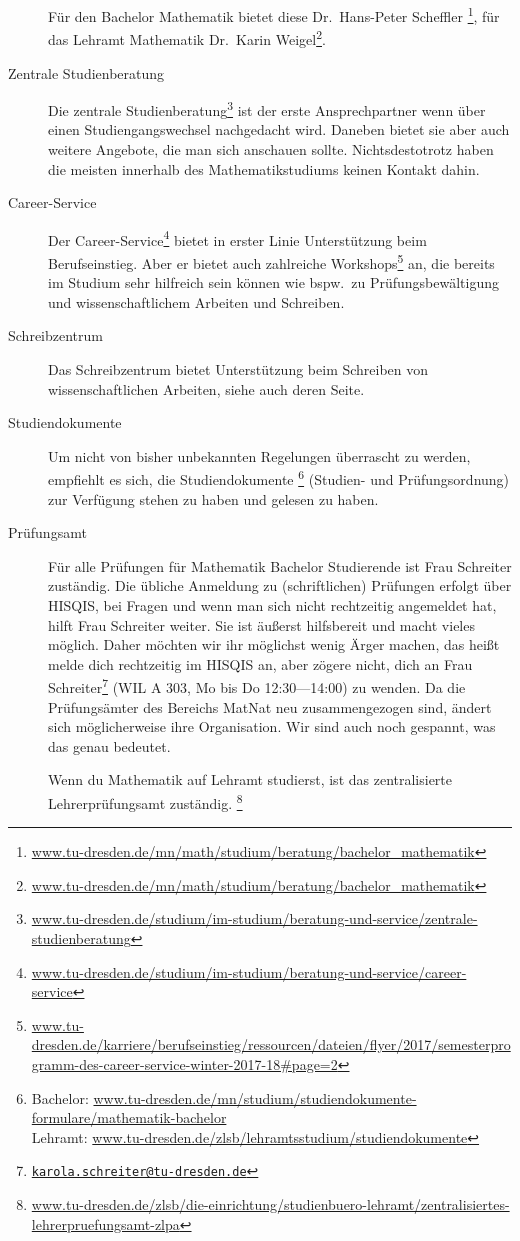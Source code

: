 \documentclass{scrartcl}
\begin{document}
\begin{description}
    Für den Bachelor Mathematik bietet diese Dr.\ Hans-Peter Scheffler%
    \footnote{\url{www.tu-dresden.de/mn/math/studium/beratung/bachelor_mathematik}}, für das Lehramt Mathematik Dr.\ Karin Weigel\footnote{\url{www.tu-dresden.de/mn/math/studium/beratung/bachelor_mathematik}}.
  \item[Zentrale Studienberatung] Die zentrale Studienberatung\footnote{\url{www.tu-dresden.de/studium/im-studium/beratung-und-service/zentrale-studienberatung}} ist der erste Ansprechpartner wenn über einen Studiengangswechsel nachgedacht wird. Daneben bietet sie aber auch weitere Angebote,
    die man sich anschauen sollte.
    Nichtsdestotrotz haben die meisten innerhalb des Mathematikstudiums keinen Kontakt dahin.
  \item[Career-Service] Der Career-Service\footnote{\url{www.tu-dresden.de/studium/im-studium/beratung-und-service/career-service}} bietet in erster Linie Unterstützung beim Berufseinstieg.
    Aber er bietet auch zahlreiche Workshops\footnote{\url{www.tu-dresden.de/karriere/berufseinstieg/ressourcen/dateien/flyer/2017/semesterprogramm-des-career-service-winter-2017-18\#page=2}} an, die bereits im Studium
    sehr hilfreich sein können wie bspw.\ zu Prüfungsbewältigung und
    wissenschaftlichem Arbeiten und Schreiben.
  \item[Schreibzentrum] Das Schreibzentrum bietet Unterstützung beim Schreiben von wissenschaftlichen Arbeiten, siehe auch deren Seite.
  \item[Studiendokumente] Um nicht von bisher unbekannten Regelungen
    überrascht zu werden, empfiehlt es sich, die Studiendokumente
    \footnote{Bachelor: \url{www.tu-dresden.de/mn/studium/studiendokumente-formulare/mathematik-bachelor}\\
    Lehramt: \url{www.tu-dresden.de/zlsb/lehramtsstudium/studiendokumente}}
    (Studien- und Prüfungsordnung) zur Verfügung stehen zu haben und
    gelesen zu haben.
  \item[Prüfungsamt] Für alle Prüfungen für Mathematik Bachelor Studierende ist
    Frau Schreiter zuständig.
    Die übliche Anmeldung zu (schriftlichen) Prüfungen erfolgt über HISQIS,
    bei Fragen und wenn man sich nicht rechtzeitig angemeldet hat, hilft Frau Schreiter weiter.
    Sie ist äußerst hilfsbereit und macht vieles möglich.
    Daher möchten wir ihr möglichst wenig Ärger machen, das heißt melde dich rechtzeitig im HISQIS an,
    aber zögere nicht,
    dich an Frau Schreiter\footnote{\href{mailto:karola.schreiter@tu-dresden.de}
    {\nolinkurl{karola.schreiter@tu-dresden.de}}} (WIL A 303, Mo bis Do 12:30---14:00) zu wenden.
    Da die Prüfungsämter des Bereichs MatNat neu zusammengezogen sind, ändert sich möglicherweise ihre
    Organisation. Wir sind auch noch gespannt, was das genau bedeutet.

    Wenn du Mathematik auf Lehramt studierst, ist das zentralisierte Lehrerprüfungsamt zuständig.
    \footnote{\url{www.tu-dresden.de/zlsb/die-einrichtung/studienbuero-lehramt/zentralisiertes-lehrerpruefungsamt-zlpa}}
\end{description}
\end{document}
